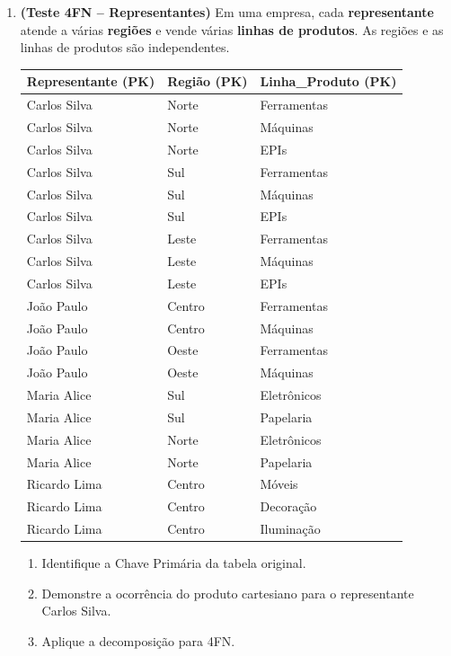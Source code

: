 \documentclass[12pt]{article}
\begin{document}
\begin{enumerate}[label=\textbf{Questão \arabic*:}, leftmargin=*]
  \vspace{0.4cm}

  \item \textbf{(Teste 4FN -- Representantes)} Em uma empresa, cada \textbf{representante} atende a várias \textbf{regiões} e vende várias \textbf{linhas de produtos}. As regiões e as linhas de produtos são independentes.
  
  \vspace{0.2cm}
  \small
  \begin{tabular}{|l|l|l|}
    \hline
    \textbf{Representante (PK)} & \textbf{Região (PK)} & \textbf{Linha\_Produto (PK)} \\ \hline
    Carlos Silva  & Norte   & Ferramentas  \\ \hline
    Carlos Silva  & Norte   & Máquinas     \\ \hline
    Carlos Silva  & Norte   & EPIs         \\ \hline
    Carlos Silva  & Sul     & Ferramentas  \\ \hline
    Carlos Silva  & Sul     & Máquinas     \\ \hline
    Carlos Silva  & Sul     & EPIs         \\ \hline
    Carlos Silva  & Leste   & Ferramentas  \\ \hline
    Carlos Silva  & Leste   & Máquinas     \\ \hline
    Carlos Silva  & Leste   & EPIs         \\ \hline
    João Paulo    & Centro  & Ferramentas  \\ \hline
    João Paulo    & Centro  & Máquinas     \\ \hline
    João Paulo    & Oeste   & Ferramentas  \\ \hline
    João Paulo    & Oeste   & Máquinas     \\ \hline
    Maria Alice   & Sul     & Eletrônicos  \\ \hline
    Maria Alice   & Sul     & Papelaria    \\ \hline
    Maria Alice   & Norte   & Eletrônicos  \\ \hline
    Maria Alice   & Norte   & Papelaria    \\ \hline
    Ricardo Lima  & Centro  & Móveis       \\ \hline
    Ricardo Lima  & Centro  & Decoração    \\ \hline
    Ricardo Lima  & Centro  & Iluminação   \\ \hline
  \end{tabular}
  \vspace{0.2cm}
  \begin{enumerate}[label=\alph*)]
    \item Identifique a Chave Primária da tabela original.
    \item Demonstre a ocorrência do produto cartesiano para o representante Carlos Silva.
    \item Aplique a decomposição para 4FN.
  \end{enumerate}
  \begin{resposta}
  \end{resposta}


\end{enumerate}
\end{document}
